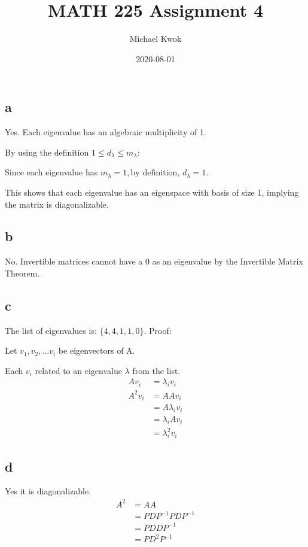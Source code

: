 \documentclass{article}
\title{MATH 225 Assignment 4}
\author{Michael Kwok}
\date{2020-08-01}
\begin{document}
\maketitle
\subsection*{a}
Yes. Each eigenvalue has an algebraic multiplicity of 1.

By using the definition $1 \leq d_{\lambda} \leq m_{\lambda}$:

Since each eigenvalue has $m_{\lambda} = 1, \text{by definition, } d_{\lambda} = 1$.

This shows that each eigenvalue has an eigenspace with basis of size 1, implying the matrix is diagonalizable.

\subsection*{b}
No. Invertible matrices cannot have a 0 as an eigenvalue by the Invertible Matrix Theorem.

\subsection*{c}
The list of eigenvalues is: $\{ 4,4,1,1,0\}$.
Proof:

Let $v_1, v_2, \ldots v_i$ be eigenvectors of A.

Each $v_i$ related to an eigenvalue $\lambda$ from the list.
\begin{align*}
    A v_i &= \lambda_i v_i\\
    A^2 v_i &= AA v_i\\
    &= A \lambda_i v_i\\
    &= \lambda_i A v_i\\
    &= \lambda^2_i v_i
\end{align*}

\subsection*{d}

Yes it is diagonalizable.
\begin{align*}
    A^2 &= AA\\
    &= PDP^{-1}PDP^{-1}\\
    &= P DD P^{-1}\\
    &= P D^2 P^{-1}
\end{align*}
\end{document}
